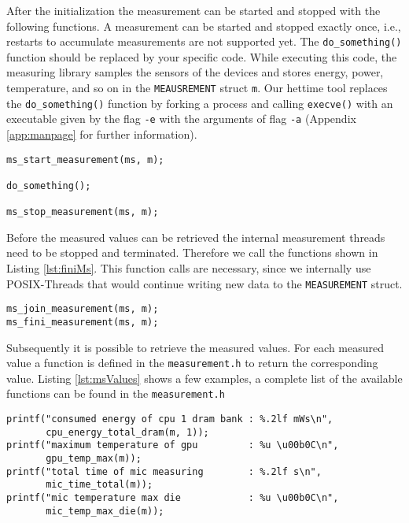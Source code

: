 After the initialization the measurement can be started and stopped with the following functions. A measurement can be started and stopped exactly once, i.e., restarts to accumulate measurements are not supported yet. The \texttt{do\_something()} function should be replaced by your specific code. While executing this code, the measuring library samples the sensors of the devices and stores energy, power, temperature, and so on in the \texttt{MEAUSREMENT} struct \texttt{m}. Our hettime tool replaces the \texttt{do\_something()} function by forking a process and calling \texttt{execve()} with an executable given by the flag \texttt{-e} with the arguments of flag \texttt{-a} (Appendix \ref{app:manpage} for further information).
\begin{lstlisting}[caption={The start and stop functions trigger the measuring procedures of the measuring library. Please replace the \texttt{do\_something()} function by the code you want to execute while the measuring system is running.},label=lst:StartStopMS]
ms_start_measurement(ms, m);

do_something();

ms_stop_measurement(ms, m);
\end{lstlisting}

Before the measured values can be retrieved the internal measurement threads need to be stopped and terminated. Therefore we call the functions shown in Listing \ref{lst:finiMs}. This function calls are necessary, since we internally use POSIX-Threads that would continue writing new data to the \texttt{MEASUREMENT} struct.
\begin{lstlisting}[caption={Functions to join and terminate measurement threads.},label=lst:finiMs]
ms_join_measurement(ms, m);
ms_fini_measurement(ms, m);
\end{lstlisting}

Subsequently it is possible to retrieve the measured values. For each measured value a function is defined in the \texttt{measurement.h} to return the corresponding value. Listing \ref{lst:msValues} shows a few examples, a complete list of the available functions can be found in the \texttt{measurement.h}

\begin{lstlisting}[caption={Example for getting the measured values.},label=lst:msValues]
printf("consumed energy of cpu 1 dram bank : %.2lf mWs\n",
	   cpu_energy_total_dram(m, 1));
printf("maximum temperature of gpu         : %u \u00b0C\n",
	   gpu_temp_max(m));
printf("total time of mic measuring        : %.2lf s\n",
	   mic_time_total(m));
printf("mic temperature max die            : %u \u00b0C\n",
	   mic_temp_max_die(m));
\end{lstlisting}

